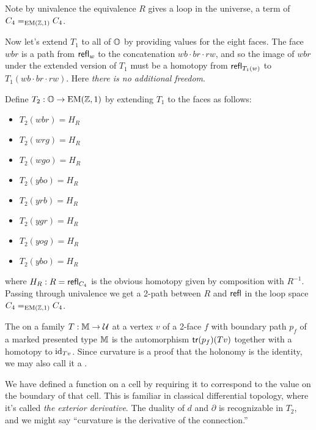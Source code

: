 Note by univalence the equivalence \( R \) gives a loop in the universe, a term of \( C_4=_{\mathrm{EM}(\mathbb{Z},1)}C_4 \).

Now let's extend \( T_1 \) to all of \( \mathbb{O} \) by providing values for the eight faces. The face \( wbr \) is a path from \( \mathsf{refl}_w \) to the concatenation \( wb\cdot br\cdot rw \), and so the image of \( wbr \) under the extended version of \( T_1 \) must be a homotopy from \( \mathsf{refl}_{T_1(w)} \) to \( T_1(wb\cdot br\cdot rw) \). Here \emph{there is no additional freedom}.

\begin{mydef}
Define \( T_2:\mathbb{O}\to\mathrm{EM}(\mathbb{Z},1) \) by extending \( T_1 \) to the faces as follows:
\begin{multicols}{2}
\begin{itemize}
\item \( T_2(wbr)=H_R \) 
\item \( T_2(wrg)=H_R \)
\item \( T_2(wgo)=H_R \)
\item \( T_2(ybo)=H_R \)
\item \( T_2(yrb)=H_R \) 
\item \( T_2(ygr)=H_R \)
\item \( T_2(yog)=H_R \)
\item \( T_2(ybo)=H_R \)
\end{itemize}
\end{multicols}
where \( H_R:R=\mathsf{refl}_{C_4} \) is the obvious homotopy given by composition with \( R^{-1} \). Passing through univalence we get a 2-path between \( R \) and \( \mathsf{refl} \) in the loop space \( C_4=_{\mathrm{EM}(\mathbb{Z},1)}C_4 \).
\end{mydef}

\begin{mydef}
\label{def:curvature}
The  on a family \( T:\mathbb{M}\to\mathcal{U} \) at a vertex \( v \) of a 2-face \( f \) with boundary path \( p_f \) of a marked presented type \( \mathbb{M} \) is the automorphism \( \mathsf{tr}(p_f)(Tv) \) together with a homotopy to \( \text{id}_{Tv} \). Since curvature is a proof that the holonomy is the identity, we may also call it a .
\end{mydef}

\begin{mynote}
We have defined a function on a cell by requiring it to correspond to the value on the boundary of that cell. This is familiar in classical differential topology, where it's called \emph{the exterior derivative}. The duality of \( d \) and \( \partial \) is recognizable in \( T_2 \), and we might say ``curvature is the derivative of the connection.''
\end{mynote}

